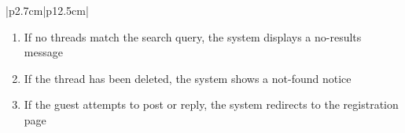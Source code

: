 \begin{table}[H]
\begin{tabular}{|p{2.7cm}|p{12.5cm}|}
\begin{minipage}[t]{\linewidth}
                                      \begin{enumerate}[topsep=0pt,itemsep=1pt,parsep=0pt,partopsep=0pt]
                                          \item If no threads match the search query, the system displays a no-results message
                                          \item If the thread has been deleted, the system shows a not-found notice
                                          \item If the guest attempts to post or reply, the system redirects to the
                                                registration page
                                      \end{enumerate}
                                  \end{minipage} \\
        \hline
    \end{tabular}
    \label{tab:guest-browse-forum}
\end{table}
